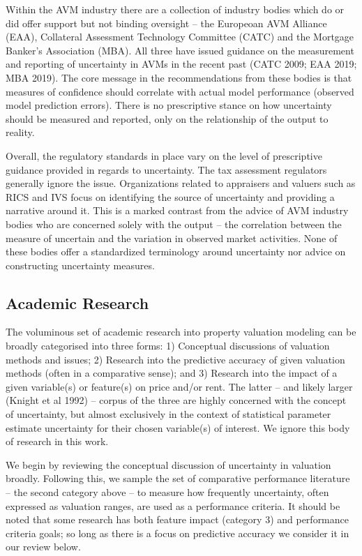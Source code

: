 \documentclass[colTwo]{anon}
\theoremstyle{definition}
\begin{document}
Within the AVM industry there are a collection of industry bodies which do or did offer support but not binding oversight -- the Europeoan AVM Alliance (EAA), Collateral Assessment Technology Committee (CATC) and the Mortgage Banker's Association (MBA). All three have issued guidance on the measurement and reporting of uncertainty in AVMs in the recent past (CATC 2009; EAA 2019; MBA 2019).  The core message in the recommendations from these bodies is that measures of confidence should correlate with actual model performance (observed model prediction errors). There is no prescriptive stance on how uncertainty should be measured and reported, only on the relationship of the output to reality.    

Overall, the regulatory standards in place vary on the level of prescriptive guidance provided in regards to uncertainty.  The tax assessment regulators generally ignore the issue. Organizations related to appraisers and valuers such as RICS and IVS focus on identifying the source of uncertainty and providing a narrative around it.  This is a marked contrast from the advice of AVM industry bodies who are concerned solely with the output -- the correlation between the measure of uncertain and the variation in observed market activities. None of these bodies offer a standardized terminology around uncertainty nor advice on constructing uncertainty measures.    

\subsection{Academic Research}

The voluminous set of academic research into property valuation modeling can be broadly categorised into three forms: 1) Conceptual discussions of valuation methods and issues; 2) Research into the predictive accuracy of given valuation methods (often in a comparative sense); and  3) Research into the impact of a given variable(s) or feature(s) on price and/or rent.  The latter -- and likely larger (Knight et al 1992) -- corpus of the three are highly concerned with the concept of uncertainty, but almost exclusively in the context of statistical parameter estimate uncertainty for their chosen variable(s) of interest. We ignore this body of research in this work. 

We begin by reviewing the conceptual discussion of uncertainty in valuation broadly.  Following this, we sample the set of comparative performance literature -- the second category above -- to measure how frequently uncertainty, often expressed as valuation ranges, are used as a performance criteria. It should be noted that some research has both feature impact (category 3) and performance criteria goals; so long as there is a focus on predictive accuracy we consider it in our review below. 
\end{document}
